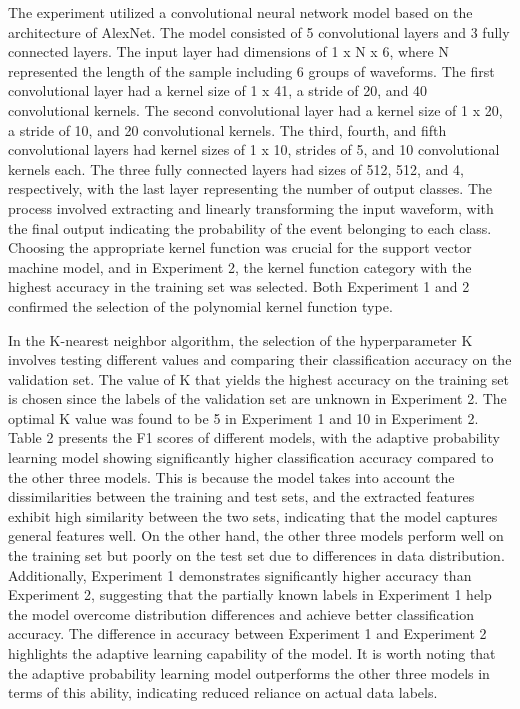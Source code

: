 \documentclass[conference]{IEEEtran}
\begin{document}
The experiment utilized a convolutional neural network model based on the architecture of AlexNet. The model consisted of 5 convolutional layers and 3 fully connected layers. The input layer had dimensions of 1 x N x 6, where N represented the length of the sample including 6 groups of waveforms. The first convolutional layer had a kernel size of 1 x 41, a stride of 20, and 40 convolutional kernels. The second convolutional layer had a kernel size of 1 x 20, a stride of 10, and 20 convolutional kernels. The third, fourth, and fifth convolutional layers had kernel sizes of 1 x 10, strides of 5, and 10 convolutional kernels each. The three fully connected layers had sizes of 512, 512, and 4, respectively, with the last layer representing the number of output classes. The process involved extracting and linearly transforming the input waveform, with the final output indicating the probability of the event belonging to each class. Choosing the appropriate kernel function was crucial for the support vector machine model, and in Experiment 2, the kernel function category with the highest accuracy in the training set was selected. Both Experiment 1 and 2 confirmed the selection of the polynomial kernel function type.

In the K-nearest neighbor algorithm, the selection of the hyperparameter K involves testing different values and comparing their classification accuracy on the validation set. The value of K that yields the highest accuracy on the training set is chosen since the labels of the validation set are unknown in Experiment 2. The optimal K value was found to be 5 in Experiment 1 and 10 in Experiment 2. Table 2 presents the F1 scores of different models, with the adaptive probability learning model showing significantly higher classification accuracy compared to the other three models. This is because the model takes into account the dissimilarities between the training and test sets, and the extracted features exhibit high similarity between the two sets, indicating that the model captures general features well. On the other hand, the other three models perform well on the training set but poorly on the test set due to differences in data distribution. Additionally, Experiment 1 demonstrates significantly higher accuracy than Experiment 2, suggesting that the partially known labels in Experiment 1 help the model overcome distribution differences and achieve better classification accuracy. The difference in accuracy between Experiment 1 and Experiment 2 highlights the adaptive learning capability of the model. It is worth noting that the adaptive probability learning model outperforms the other three models in terms of this ability, indicating reduced reliance on actual data labels.
\end{document}
